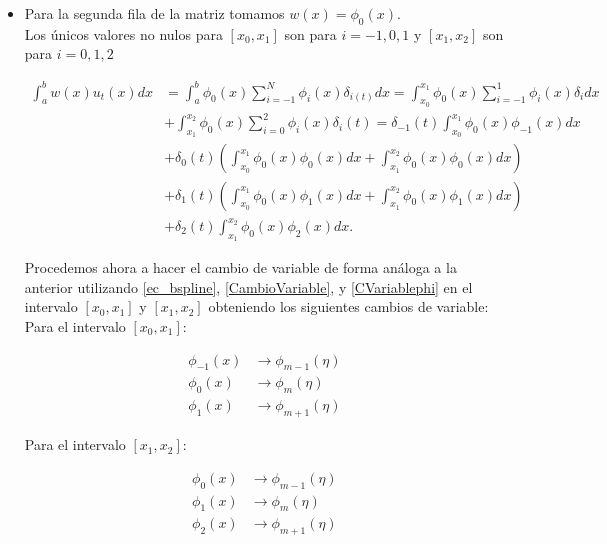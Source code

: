 \begin{itemize}
    \item Para la segunda fila de la matriz tomamos $w(x) = \phi_{0}(x)$.\\

Los únicos valores no nulos para $[x_{0},x_{1}]$ son para $i=-1,0,1$ y  $[x_{1},x_{2}]$ son para $i=0,1,2$

\begin{equation}
\label{wphi0}
   \begin{split}
        \int_{a}^{b}w(x) u_{t}(x)dx & =\int_{a}^{b}\phi_{0}(x)\sum_{i=-1}^{N}\phi_{i}(x)\delta_{i(t)}dx=\int_{x_{0}}^{x_{1}}\phi_{0}(x)\sum_{i=-1}^{1}\phi_{i}(x)\delta_{i}dx\\
    & + \int_{x_{1}}^{x_{2}}\phi_{0}(x)\sum_{i=0}^{2}\phi_{i}(x)\delta_{i}(t)=\delta_{-1}(t)\int_{x_{0}}^{x_{1}}\phi_{0}(x)\phi_{-1}(x)dx\\
    & + \delta_{0}(t)\left(\int_{x_{0}}^{x_{1}}\phi_{0}(x)\phi_{0}(x)dx+\int_{x_{1}}^{x_{2}}\phi_{0}(x)\phi_{0}(x)dx\right) \\
    & + \delta_{1}(t)\left(\int_{x_{0}}^{x_{1}}\phi_{0}(x)\phi_{1}(x)dx +\int_{x_{1}}^{x_{2}}\phi_{0}(x)\phi_{1}(x)dx \right)\\
    & +\delta_{2}(t)\int_{x_{1}}^{x_{2}}\phi_{0}(x)\phi_{2}(x)dx.
   \end{split}
\end{equation}


Procedemos ahora a hacer el cambio de variable de forma análoga a la anterior utilizando  \ref{ec_bspline}, \ref{CambioVariable}, y \ref{CVariablephi} en el intervalo $[x_{0},x_{1}]$ y $[x_{1},x_{2}]$ obteniendo los siguientes cambios de variable:\\

Para el intervalo $[x_{0},x_{1}]$:

\begin{align*}
    \phi_{-1}(x) & \rightarrow \phi_{m-1}(\eta)\\
    \phi_{0}(x) & \rightarrow \phi_{m}(\eta)\\
    \phi_{1}(x) & \rightarrow \phi_{m+1}(\eta)
\end{align*}

Para el intervalo $[x_{1},x_{2}]$:

\begin{align*}
    \phi_{0}(x) &\rightarrow \phi_{m-1}(\eta)\\
    \phi_{1}(x) &\rightarrow \phi_{m}(\eta)\\
    \phi_{2}(x) &\rightarrow \phi_{m+1}(\eta)
\end{align*}


\end{itemize}
